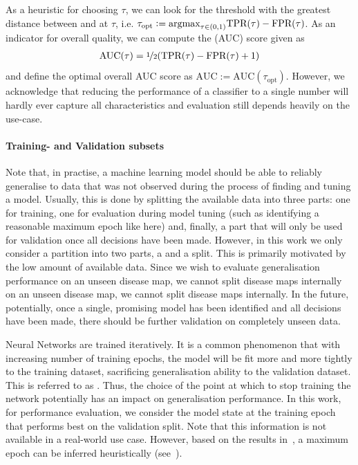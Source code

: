 \documentclass[
	fontsize=10pt, %
	twoside=false, %
	secnumdepth=1, %
  toc=indentunnumbered %
]{kaobook}
\begin{document}
As a heuristic for choosing $\tau$, we can look for the threshold with the greatest
distance between \TPR{} and \FPR{} at $\tau$, i.e. $\tau_{\text{opt}} := \argmax_{\tau \in
  (0,1)} \TPR{}(\tau) - \FPR{}(\tau)$.
As an indicator for overall quality, we can compute the 
(AUC) score given as
\begin{align*}
  \text{AUC}(\tau) = \nicefrac{1}{2} (\TPR{}(\tau) - \FPR{}(\tau) + 1)
\end{align*}
and define the optimal overall AUC score as $\text{AUC} := \text{AUC}(\tau_{\text{opt}})$.
However, we acknowledge that reducing the performance of a classifier to a
single number will hardly ever capture all characteristics and evaluation still
depends heavily on the use-case.


\paragraph{Training- and Validation subsets}
Note that, in practise, a machine learning model should be able to reliably generalise to data
that was not observed during the process of finding and tuning a model. Usually,
this is done by splitting the available data into three parts: one for training,
one for evaluation during model tuning (such as identifying a reasonable maximum
epoch like here) and, finally, a part that will only be used for validation once
all decisions have been made.
%
However, in this work we only consider a partition into two parts, a
 and a  split. This is primarily motivated by the
low amount of available data. Since we wish to evaluate generalisation
performance on an unseen disease map, we cannot split disease maps internally on
an unseen disease map, we cannot split disease maps internally.
% 
In the future, potentially, once a single, promising model has been identified
and all decisions have been made, there should be further validation on completely
unseen data.

Neural Networks are trained iteratively. It is a common phenomenon that with
increasing number of training epochs, the model will be fit more and more
tightly to the training dataset, sacrificing generalisation ability to the
validation dataset. This is referred to as . Thus, the choice
of the point at which to stop training the network potentially has an impact on
generalisation performance. In this work, for performance evaluation, we
consider the model state at the training epoch that performs best on the
validation split. Note that this information is not available in a real-world
use case. However, based on the results in~, a maximum epoch
can be inferred heuristically (see~).
\end{document}
